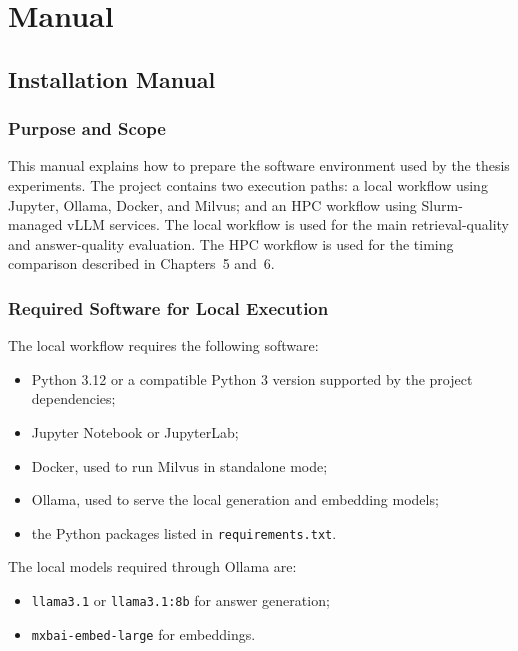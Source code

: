 \chapter*{Manual}
{}

\section*{Installation Manual}

\subsection*{Purpose and Scope}

This manual explains how to prepare the software environment used by the thesis experiments. The project contains two execution paths: a local workflow using Jupyter, Ollama, Docker, and Milvus; and an \ac{HPC} workflow using Slurm-managed vLLM services. The local workflow is used for the main retrieval-quality and answer-quality evaluation. The \ac{HPC} workflow is used for the timing comparison described in Chapters~5 and~6.

\subsection*{Required Software for Local Execution}

The local workflow requires the following software:

\begin{itemize}
    \item Python 3.12 or a compatible Python 3 version supported by the project dependencies;
    \item Jupyter Notebook or JupyterLab;
    \item Docker, used to run Milvus in standalone mode;
    \item Ollama, used to serve the local generation and embedding models;
    \item the Python packages listed in \texttt{requirements.txt}.
\end{itemize}

The local models required through Ollama are:

\begin{itemize}
    \item \texttt{llama3.1} or \texttt{llama3.1:8b} for answer generation;
    \item \texttt{mxbai-embed-large} for embeddings.
\end{itemize}

